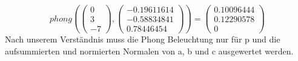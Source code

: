 \documentclass{article}
\begin{document}
\[
phong(
\begin{pmatrix}
0\\3\\-7
\end{pmatrix},\begin{pmatrix}
-0.19611614 \\ -0.58834841 \\ 0.78446454
\end{pmatrix})=
\begin{pmatrix}
0.10096444\\ 0.12290578\\ 0
\end{pmatrix}
\]
Nach unserem Verständnis muss die Phong Beleuchtung nur für p und die aufsummierten und normierten Normalen von a, b und c ausgewertet werden.
\end{document}
